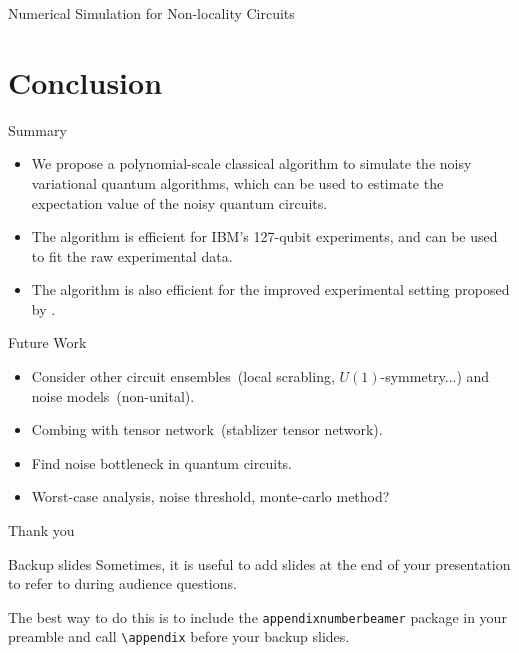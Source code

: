 \documentclass[10pt]{beamer}
\begin{document}
\begin{CJK}{UTF8}{gbsn}
\begin{frame}[fragile]{Numerical Simulation for Non-locality Circuits}
\begin{figure}
\begin{subfigure}[t]{\textwidth}
\begin{minipage}[t]{0.45\textwidth}
      \end{minipage}
    \end{subfigure}
  \end{figure}
\end{frame}

\section{Conclusion}

\begin{frame}[fragile]{Summary}
  \begin{itemize}
    \item We propose a polynomial-scale classical algorithm to simulate the noisy variational quantum algorithms, which can be used to estimate the expectation value of the noisy quantum circuits.
    \item The algorithm is efficient for IBM's 127-qubit experiments, and can be used to fit the raw experimental data.
    \item The algorithm is also efficient for the improved experimental setting proposed by \cite{anand2023classical}.
  \end{itemize}
\end{frame}


\begin{frame}[fragile]{Future Work}
  \begin{itemize}
    \item Consider other circuit ensembles~(local scrabling, $U(1)$-symmetry...) and noise models~(non-unital).
    \item Combing with tensor network~(stablizer tensor network).
    \item Find noise bottleneck in quantum circuits.
    \item Worst-case analysis, noise threshold, monte-carlo method?
  \end{itemize}
\end{frame}

\begin{frame}[standout]
 Thank you
\end{frame}

\appendix

\begin{frame}[fragile]{Backup slides}
 Sometimes, it is useful to add slides at the end of your presentation to
 refer to during audience questions.

 The best way to do this is to include the \verb|appendixnumberbeamer|
 package in your preamble and call \verb|\appendix| before your backup slides.


\end{frame}
\end{CJK}
\end{document}
